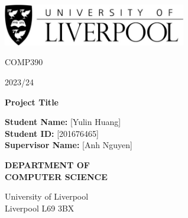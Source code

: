 \documentclass[12pt]{article}
\begin{document}
\begin{titlepage}
    \centering

    \vspace*{1cm}
    \includegraphics[width=0.6\textwidth]{Liverpool.jpg} %
    \vspace*{1cm}

    \Large
    COMP390

    \large
    2023/24

    \vspace{0.5cm}
    \Huge
    \textbf{Project Title}

    \vspace{1.5cm}

    
 \begin{mdframed}
    \normalsize %
    \textbf{Student Name:} [Yulin Huang]\\[20pt] %
    \textbf{Student ID:} [201676465]\\[20pt] %
    \textbf{Supervisor Name:} [Anh Nguyen] %
\end{mdframed}

    \vspace{2cm} %
    \Large
    \textbf{DEPARTMENT OF}\\
    \vspace{0.1cm} %
    \textbf{COMPUTER SCIENCE}

    \vspace{3cm} %
    \large
    University of Liverpool\\
    Liverpool L69 3BX


\end{titlepage}
\end{document}
